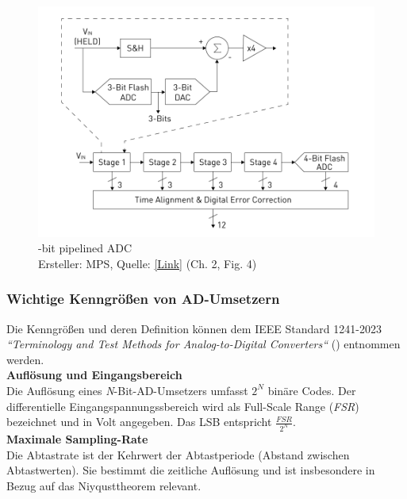 \documentclass[a4paper, portrait, 12pt]{scrartcl} %
\begin{document}
\begin{figure}[H]
	\centering
		\includegraphics[scale=0.3]{ADC_Chapter_2_Fig4-_960_x_658.png} 
		\caption{-bit pipelined ADC\\ \footnotesize Ersteller: MPS, Quelle: \href{https://www.monolithicpower.com/en/learning/mpscholar/analog-to-digital-converters/detailed-analysis-of-adc-architectures/pipeline-adcs}{[Link]} (Ch. 2, Fig. 4)
		}
	\label{fig:pipelined_adc}
\end{figure}
\pagebreak

\subsubsection{Wichtige Kenngrößen von AD-Umsetzern}
\label{subsubsec:adc_characteristics}

Die Kenngrößen und deren Definition können dem IEEE Standard 1241-2023 \emph{``Terminology and Test Methods for Analog-to-Digital Converters``} (\cite[S. 22ff]{IEEE2023}) entnommen werden.\\

\textbf{Auflösung und Eingangsbereich}\\
Die Auflösung eines \emph{N}-Bit-AD-Umsetzers umfasst $2^N$ binäre Codes. Der differentielle Eingangspannungssbereich wird als Full-Scale Range (\emph{FSR}) bezeichnet und in Volt angegeben. Das LSB entspricht $\frac{FSR}{2^N}$.\\

\textbf{Maximale Sampling-Rate}\\
Die Abtastrate ist der Kehrwert der Abtastperiode (Abstand zwischen Abtastwerten). Sie bestimmt die zeitliche Auflösung und ist insbesondere in Bezug auf das Niyqusttheorem relevant.\\
\end{document}
